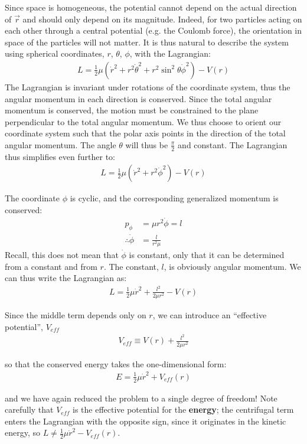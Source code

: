 Since space is homogeneous, the potential cannot depend on the actual direction of $\vec{r}$ and should only depend on its magnitude. Indeed, for two particles acting on each other through a central potential (e.g. the Coulomb force), the orientation in space of the particles will not matter. It is thus natural to describe the system using spherical coordinates, $r$, $\theta$, $\phi$, with the Lagrangian:
\begin{align}
L=\frac{1}{2}\mu(\dot{r}^2+r^2\dot{\theta}^2+r^2\sin^2\theta\dot{\phi}^2)-V(r)
\end{align}
The Lagrangian is invariant under rotations of the coordinate system, thus the angular momentum in each direction is conserved. Since the total angular momentum is conserved, the motion must be constrained to the plane perpendicular to the total angular momentum. We thus choose to orient our coordinate system such that the polar axis points in the direction of the total angular momentum. The angle $\theta$ will thus be $\frac{\pi}{2}$ and constant. The Lagrangian thus simplifies even further to:
\begin{align}
L=\frac{1}{2}\mu(\dot{r}^2+r^2\dot{\phi}^2)-V(r)
\end{align}

The coordinate $\phi$ is cyclic, and the corresponding generalized momentum is conserved:
\begin{align}
p_\phi&=\mu r^2\dot\phi=l\nonumber\\
\therefore \dot\phi&=\frac{l}{r^2\mu}
\end{align}
Recall, this does not mean that $\dot\phi$ is constant, only that it can be determined from a constant and from $r$. The constant, $l$, is obviously angular momentum. We can thus write the Lagrangian as:
\begin{align}
L=\frac{1}{2}\mu\dot{r}^2+\frac{l^2}{2\mu r^2}-V(r)
\end{align}
 
Since the middle term depends only on $r$, we can introduce an ``effective potential'', $V_{eff}$
\begin{align}
V_{eff}\equiv V(r)+\frac{l^2}{2\mu r^2}
\label{eqn:Veff}
\end{align}

so that the conserved energy takes the one-dimensional form:
\begin{align}
E=\frac{1}{2}\mu\dot{r}^2+V_{eff}(r)
\end{align}

and we have again reduced the problem to a single degree of freedom! Note carefully that $V_{eff}$ is the effective potential for the \textbf{energy}; the centrifugal term enters the Lagrangian with the opposite sign, since it originates in the kinetic energy, so $L\neq\frac{1}{2}\mu\dot{r}^2-V_{eff}(r)$.

